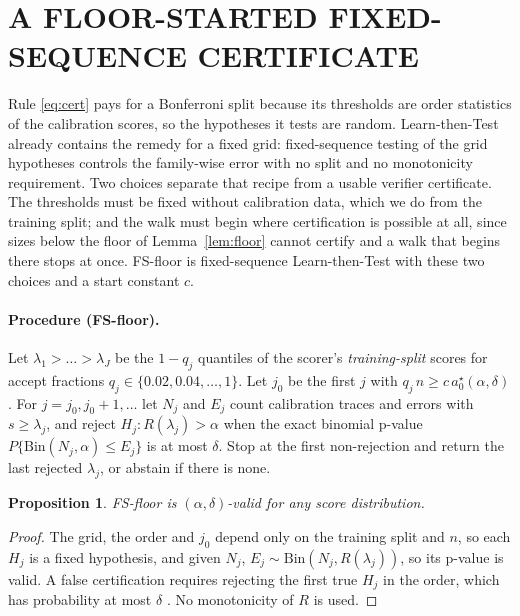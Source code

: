\documentclass[twoside]{article}
\newtheorem{proposition}{Proposition}
\theoremstyle{remark}
\newcommand{\Rsel}{R}
\begin{document}
\section{A FLOOR-STARTED FIXED-SEQUENCE CERTIFICATE}
\label{sec:fs}

Rule \eqref{eq:cert} pays for a Bonferroni split because its thresholds are order statistics of the calibration scores, so the hypotheses it tests are random. Learn-then-Test \citep{angelopoulos2021ltt} already contains the remedy for a fixed grid: fixed-sequence testing of the grid hypotheses controls the family-wise error with no split and no monotonicity requirement. Two choices separate that recipe from a usable verifier certificate. The thresholds must be fixed without calibration data, which we do from the training split; and the walk must begin where certification is possible at all, since sizes below the floor of Lemma~\ref{lem:floor} cannot certify and a walk that begins there stops at once. FS-floor is fixed-sequence Learn-then-Test with these two choices and a start constant $c$.

\paragraph{Procedure (FS-floor).} Let $\lambda_1>\dots>\lambda_J$ be the $1-q_j$ quantiles of the scorer's \emph{training-split} scores for accept fractions $q_j\in\{0.02,0.04,\dots,1\}$. Let $j_0$ be the first $j$ with $q_j\,n\ge c\,a_0^\star(\alpha,\delta)$. For $j=j_0,j_0+1,\dots$ let $N_j$ and $E_j$ count calibration traces and errors with $s\ge\lambda_j$, and reject $H_j:\Rsel(\lambda_j)>\alpha$ when the exact binomial p-value $P\{\mathrm{Bin}(N_j,\alpha)\le E_j\}$ is at most $\delta$. Stop at the first non-rejection and return the last rejected $\lambda_j$, or abstain if there is none.

\begin{proposition}
\label{prop:fs}
FS-floor is $(\alpha,\delta)$-valid for any score distribution.
\end{proposition}

\begin{proof}
The grid, the order and $j_0$ depend only on the training split and $n$, so each $H_j$ is a fixed hypothesis, and given $N_j$, $E_j\sim\mathrm{Bin}(N_j,\Rsel(\lambda_j))$, so its p-value is valid. A false certification requires rejecting the first true $H_j$ in the order, which has probability at most $\delta$ \citep{bauer1991multiple}. No monotonicity of $\Rsel$ is used.
\end{proof}
\end{document}
